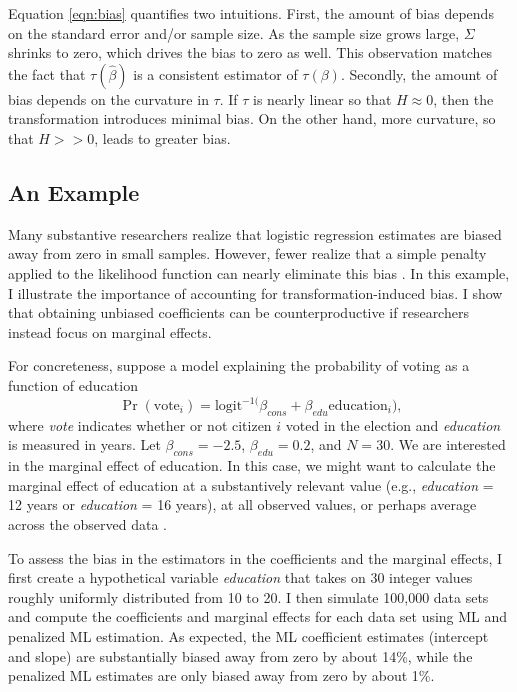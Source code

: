 \documentclass[12pt]{article}
\begin{document}
Equation \ref{eqn:bias} quantifies two intuitions. First, the amount of bias depends on the standard error and/or sample size. As the sample size grows large, $\Sigma$ shrinks to zero, which drives the bias to zero as well. 
This observation matches the fact that $\tau(\hat{\beta})$ is a consistent estimator of $\tau(\beta)$. 
Secondly, the amount of bias depends on the curvature in $\tau$. 
If $\tau$ is nearly linear so that $H \approx 0$, then the transformation introduces minimal bias. 
On the other hand, more curvature, so that $H >> 0$, leads to greater bias. 

\subsection*{An Example}

Many substantive researchers realize that logistic regression estimates are biased away from zero in small samples. 
However, fewer realize that a simple penalty applied to the likelihood function can nearly eliminate this bias \citep{Firth1993}. 
In this example, I illustrate the importance of accounting for transformation-induced bias. 
I show that obtaining unbiased coefficients can be counterproductive if researchers instead focus on marginal effects.

For concreteness, suppose a model explaining the probability of voting as a function of education
\begin{equation}
\Pr (\text{vote}_i) = \text{logit}^{-1(}\beta_{cons} + \beta_{edu} \text{education}_i) \text{,}\nonumber
\end{equation}
where \textit{vote} indicates whether or not citizen $i$ voted in the election and \textit{education} is measured in years. 
Let $\beta_{cons} = -2.5$, $\beta_{edu} = 0.2$, and $N = 30$. 
We are interested in the marginal effect of education. 
In this case, we might want to calculate the marginal effect of education at a substantively relevant value (e.g., \textit{education} = 12 years or \textit{education} = 16 years), at all observed values, or perhaps average across the observed data \citep{HanmerKalkan2013}.

To assess the bias in the estimators in the coefficients and the marginal effects, I first create a hypothetical variable \textit{education} that takes on 30 integer values roughly uniformly distributed from 10 to 20. 
I then simulate 100,000 data sets and compute the coefficients and marginal effects for each data set using ML and penalized ML estimation. 
As expected, the ML coefficient estimates (intercept and slope) are substantially biased away from zero by about 14\%, while the penalized ML estimates are only biased away from zero by about 1\%.
\end{document}
